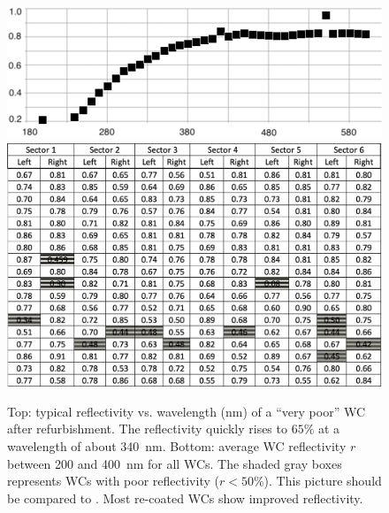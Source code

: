 \begin{figure}
	\centering
	\includegraphics[width=0.98\columnwidth,keepaspectratio]{img/winstoConeSample1Reflectivity.png}
	\includegraphics[width=0.98\columnwidth,keepaspectratio]{img/wcStatusAfter.png}
	\caption{Top: typical reflectivity vs. wavelength (nm) of a ``very poor'' WC after refurbishment. The
          reflectivity quickly rises to $65\%$ at a wavelength of about 340~nm. Bottom: average WC reflectivity $r$
          between 200 and 400~nm for all WCs. The shaded gray boxes represents WCs with poor reflectivity
          ($r < 50\%$). This picture should be compared to . Most re-coated WCs show improved
          reflectivity.}
	\label{fig:wcStatusAfter}
\end{figure}


